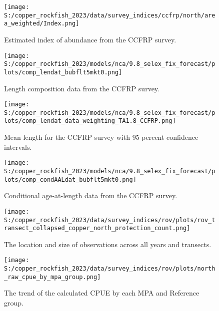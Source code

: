 \documentclass[11pt,
  english,
  letterpaper,
]{article}
\begin{document}
\begin{figure}
\centering
\texttt{[image: S:/copper\_rockfish\_2023/data/survey\_indices/ccfrp/north/area\_weighted/Index.png]}
\caption{Estimated index of abundance from the CCFRP survey.\label{fig:ccfrp-index-main}}
\end{figure}

\pagebreak

\begin{figure}
\centering
\texttt{[image: S:/copper\_rockfish\_2023/models/nca/9.8\_selex\_fix\_forecast/plots/comp\_lendat\_bubflt5mkt0.png]}
\caption{Length composition data from the CCFRP survey.\label{fig:ccfrp-len-data}}
\end{figure}

\pagebreak

\begin{figure}
\centering
\texttt{[image: S:/copper\_rockfish\_2023/models/nca/9.8\_selex\_fix\_forecast/plots/comp\_lendat\_data\_weighting\_TA1.8\_CCFRP.png]}
\caption{Mean length for the CCFRP survey with 95 percent confidence intervals.\label{fig:ccfrp-mean-len-data}}
\end{figure}

\pagebreak

\begin{figure}
\centering
\texttt{[image: S:/copper\_rockfish\_2023/models/nca/9.8\_selex\_fix\_forecast/plots/comp\_condAALdat\_bubflt5mkt0.png]}
\caption{Conditional age-at-length data from the CCFRP survey.\label{fig:ccfrp-age-data}}
\end{figure}

\pagebreak

\begin{figure}
\centering
\texttt{[image: S:/copper\_rockfish\_2023/data/survey\_indices/rov/plots/rov\_transect\_collapsed\_copper\_north\_protection\_count.png]}
\caption{The location and size of observations across all years and transects.\label{fig:rov-obs-loc}}
\end{figure}

\pagebreak

\begin{figure}
\centering
\texttt{[image: S:/copper\_rockfish\_2023/data/survey\_indices/rov/plots/north\_raw\_cpue\_by\_mpa\_group.png]}
\caption{The trend of the calculated CPUE by each MPA and Reference group.\label{fig:rov-raw-cpue}}
\end{figure}
\end{document}

